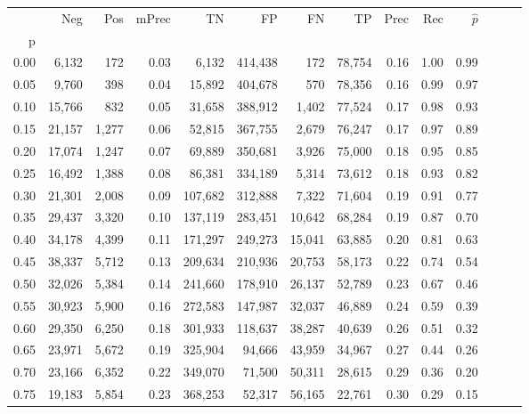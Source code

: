 \begin{tabular}{rrrrrrrrrrrrrr}
\toprule
{} &     Neg &    Pos & mPrec &       TN &       FP &      FN &      TP &  Prec &   Rec & $\hat{p}$ \\
p    &         &        &       &          &          &         &         &       &       &           \\
\midrule
0.00 &   6,132 &    172 &  0.03 &    6,132 &  414,438 &     172 &  78,754 &  0.16 &  1.00 &      0.99 \\
0.05 &   9,760 &    398 &  0.04 &   15,892 &  404,678 &     570 &  78,356 &  0.16 &  0.99 &      0.97 \\
0.10 &  15,766 &    832 &  0.05 &   31,658 &  388,912 &   1,402 &  77,524 &  0.17 &  0.98 &      0.93 \\
0.15 &  21,157 &  1,277 &  0.06 &   52,815 &  367,755 &   2,679 &  76,247 &  0.17 &  0.97 &      0.89 \\
0.20 &  17,074 &  1,247 &  0.07 &   69,889 &  350,681 &   3,926 &  75,000 &  0.18 &  0.95 &      0.85 \\
0.25 &  16,492 &  1,388 &  0.08 &   86,381 &  334,189 &   5,314 &  73,612 &  0.18 &  0.93 &      0.82 \\
0.30 &  21,301 &  2,008 &  0.09 &  107,682 &  312,888 &   7,322 &  71,604 &  0.19 &  0.91 &      0.77 \\
0.35 &  29,437 &  3,320 &  0.10 &  137,119 &  283,451 &  10,642 &  68,284 &  0.19 &  0.87 &      0.70 \\
0.40 &  34,178 &  4,399 &  0.11 &  171,297 &  249,273 &  15,041 &  63,885 &  0.20 &  0.81 &      0.63 \\
0.45 &  38,337 &  5,712 &  0.13 &  209,634 &  210,936 &  20,753 &  58,173 &  0.22 &  0.74 &      0.54 \\
0.50 &  32,026 &  5,384 &  0.14 &  241,660 &  178,910 &  26,137 &  52,789 &  0.23 &  0.67 &      0.46 \\
0.55 &  30,923 &  5,900 &  0.16 &  272,583 &  147,987 &  32,037 &  46,889 &  0.24 &  0.59 &      0.39 \\
0.60 &  29,350 &  6,250 &  0.18 &  301,933 &  118,637 &  38,287 &  40,639 &  0.26 &  0.51 &      0.32 \\
0.65 &  23,971 &  5,672 &  0.19 &  325,904 &   94,666 &  43,959 &  34,967 &  0.27 &  0.44 &      0.26 \\
0.70 &  23,166 &  6,352 &  0.22 &  349,070 &   71,500 &  50,311 &  28,615 &  0.29 &  0.36 &      0.20 \\
0.75 &  19,183 &  5,854 &  0.23 &  368,253 &   52,317 &  56,165 &  22,761 &  0.30 &  0.29 &      0.15 \\

\end{tabular}
